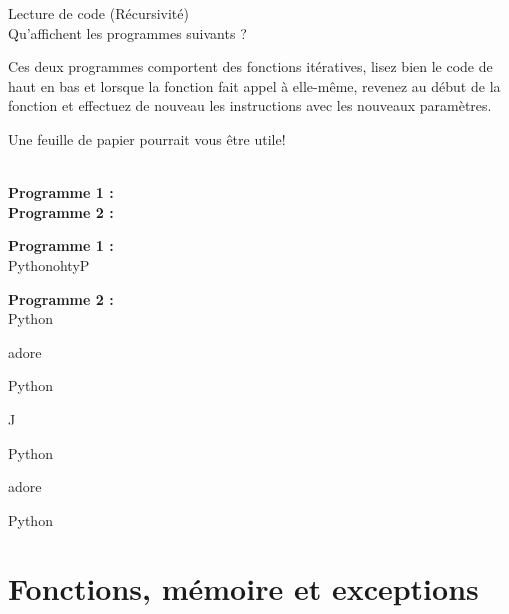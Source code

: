 \begin{Exercice}[5 minutes] Lecture de code (Récursivité)\\

Qu'affichent les programmes suivants ? \\

\begin{conseil}
   Ces deux programmes comportent des fonctions itératives, lisez bien le code de haut en bas et lorsque la fonction fait appel à elle-même, revenez au début de la fonction et effectuez de nouveau les instructions avec les nouveaux paramètres.
   
   Une feuille de papier pourrait vous être utile!\\
\end{conseil}

\textbf{\\Programme 1 :} \\

     

\textbf{Programme 2 :} \\

    

    
\begin{solution}
    \textbf{Programme 1 :} \\

    PythonohtyP
    
\end{solution}


\begin{solution}   
    \textbf{Programme 2 :} \\

    Python
    
    adore
    
    Python
    
    J
    
    Python
    
    adore
    
    Python
    
\end{solution}

\end{Exercice}

\section{Fonctions, mémoire et exceptions}

